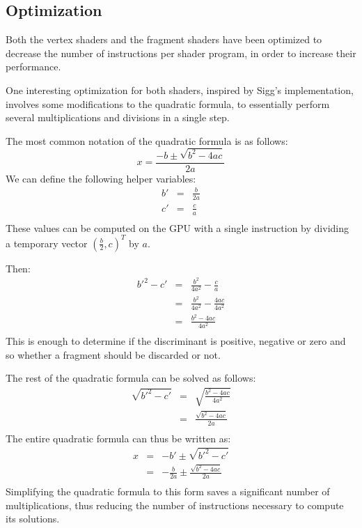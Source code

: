 \subsection*{Optimization}
Both the vertex shaders and the fragment shaders have been optimized to decrease the number of instructions per shader program, 
in order to increase their performance.

One interesting optimization for both shaders, inspired by Sigg's implementation, involves some modifications to the
quadratic formula, to essentially perform several multiplications and divisions in a single step. 

The most common notation of the quadratic formula is as follows:
\[
x = \frac{-b \pm \sqrt{b^2 - 4ac}}{2a}
\]
We can define the following helper variables:
\begin{eqnarray*}
b' & = & \frac{b}{2a}\\
c' & = & \frac{c}{a}\\
\end{eqnarray*}
These values can be computed on the GPU with a single instruction by dividing a temporary vector $(\frac{b}{2}, c)^T$ by $a$.

Then:
\begin{eqnarray*}
b'^2 - c' & = & \frac{b^2}{4a^2} - \frac{c}{a}\\
 & = & \frac{b^2}{4a^2} - \frac{4ac}{4a^2}\\
 & = & \frac{b^2 - 4ac}{4a^2}\\
\end{eqnarray*}
This is enough to determine if the discriminant is positive, negative or zero and so whether a fragment should be discarded or not.

The rest of the quadratic formula can be solved as follows:
\begin{eqnarray*}
\sqrt{b'^2 - c'} & = & \sqrt{\frac{b^2 - 4ac}{4a^2}}\\
 & = & \frac{\sqrt{b^2 - 4ac}}{2a}\\
\end{eqnarray*}
The entire quadratic formula can thus be written as:
\begin{eqnarray*}
x & = & -b' \pm \sqrt{b'^2 - c'}\\
 & = & -\frac{b}{2a} \pm \frac{\sqrt{b^2 - 4ac}}{2a}\\
\end{eqnarray*}
Simplifying the quadratic formula to this form saves a significant number of multiplications, thus reducing the number of instructions necessary
to compute its solutions.

